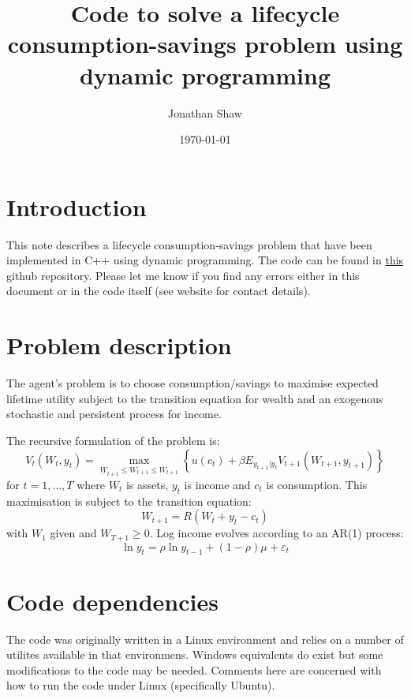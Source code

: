\documentclass[12pt]{article}
\title{Code to solve a lifecycle consumption-savings problem using dynamic programming}
\author{
        Jonathan Shaw
}
\date{\today}
\begin{document}
\maketitle

\section{Introduction}

This note describes a lifecycle consumption-savings problem that have been implemented in C++ using dynamic programming. The code can be found in \href{https://github.com/jms202/simpleLCDP.git}{this} github repository. Please let me know if you find any errors either in this document or in the code itself (see website for contact details).

\section{Problem description}

The agent's problem is to choose consumption/savings to maximise expected lifetime utility subject to the transition equation for wealth and an exogenous stochastic and persistent process for income.

The recursive formulation of the problem is:
\begin{equation}
	V_t(W_t, y_t) = \max_{\underline{W}_{t+1} \leq W_{t+1} \leq \overline{W}_{t+1}} \left\{ u(c_t) + \beta E_{y_{t+1} | y_t} V_{t+1}(W_{t+1}, y_{t+1}) \right\}
\end{equation}
for \(t=1,\ldots,T\) where \(W_t\) is assets, \(y_t\) is income and \(c_t\) is consumption. This maximisation is subject to the transition equation:
\begin{equation}
	W_{t+1} = R (W_t + y_t - c_t)
\end{equation}
with \(W_1\) given and \(W_{T+1} \geq 0\). Log income evolves according to an AR(1) process:
\begin{equation}
	\ln y_t = \rho \ln y_{t-1} + (1-\rho) \mu + \varepsilon_t
\end{equation}

\section{Code dependencies}

The code was originally written in a Linux environment and relies on a number of utilites available in that environmens. Windows equivalents do exist but some modifications to the code may be needed. Comments here are concerned with how to run the code under Linux (specifically Ubuntu).
\end{document}
